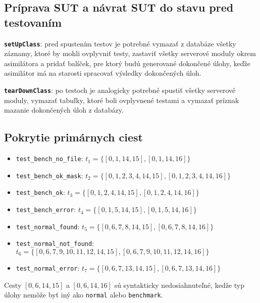 \subsection*{Príprava SUT a návrat SUT do stavu pred testovaním}
\begin{description}
	\item \textbf{\texttt{setUpClass}}: pred spustením testov je potrebné vymazať z databáze všetky záznamy, ktoré by mohli ovplyvniť testy, zastaviť všetky serverové moduly okrem asimilátora a pridať balíček, pre ktorý budú generované dokončené úlohy, keďže asimilátor má na starosti spracovať výsledky dokončených úloh.
	\item \textbf{\texttt{tearDownClass}}: po testoch je analogicky potrebné spustiť všetky serverové moduly, vymazať tabuľky, ktoré boli ovplyvnené testami a vymazať príznak mazanie dokončených úloh z databázy.
\end{description}

\subsection*{Pokrytie primárnych ciest}
\begin{itemize}
	\item \texttt{test\_bench\_no\_file}: $t_1 = \{[0, 1, 14, 15], [0, 1, 14, 16]\}$
	\item \texttt{test\_bench\_ok\_mask}: $t_2 = \{[0, 1, 2, 3, 4, 14, 15], [0, 1, 2, 3, 4, 14, 16]\}$
	\item \texttt{test\_bench\_ok}: $t_3 = \{[0, 1, 2, 4, 14, 15], [0, 1, 2, 4, 14, 16]\}$
	\item \texttt{test\_bench\_error}: $t_4 = \{[0, 1, 5, 14, 15], [0, 1, 5, 14, 16]\}$
	\item \texttt{test\_normal\_found}: $t_5 = \{[0, 6, 7, 8, 14, 15], [0, 6, 7, 8, 14, 16]\}$
	\item \texttt{test\_normal\_not\_found}: $t_6 = \{[0, 6, 7, 9, 10, 11, 12, 14, 15], [0, 6, 7, 9, 10, 11, 12, 14, 16]\}$
	\item \texttt{test\_normal\_error}: $t_7 = \{[0, 6, 7, 13, 14, 15], [0, 6, 7, 13, 14, 16]\}$
\end{itemize}
Cesty $[0, 6, 14, 15]$ a $[0, 6, 14, 16]$ sú syntakticky nedosiahnuteľné, kedže typ úlohy nemôže byť iný ako \texttt{normal} alebo \texttt{benchmark}.
 \\
 \\
 \\

